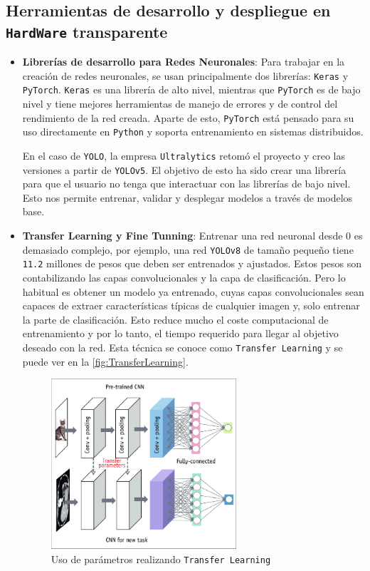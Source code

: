 \subsection{Herramientas de desarrollo y despliegue en \texttt{HardWare} transparente}

\begin{itemize}
    \item \textbf{Librerías de desarrollo para Redes Neuronales}: Para trabajar en la creación de redes neuronales, se usan principalmente dos librerías: \texttt{Keras} y \texttt{PyTorch}.
    \texttt{Keras} es una librería de alto nivel, mientras que \texttt{PyTorch} es de bajo nivel y tiene mejores herramientas de manejo de errores y de control del rendimiento de la red creada. 
    Aparte de esto, \texttt{PyTorch} está pensado para su uso directamente en \texttt{Python} y soporta entrenamiento en sistemas distribuidos.


    En el caso de \texttt{YOLO}, la empresa \texttt{Ultralytics} retomó el proyecto y creo las versiones a partir de \texttt{YOLOv5}. El objetivo de esto ha sido crear una librería para 
    que el usuario no tenga que interactuar con las librerías de bajo nivel. Esto nos permite entrenar, validar y desplegar modelos a través de modelos base.
    \item \textbf{Transfer Learning y Fine Tunning}: Entrenar una red neuronal desde 0 es demasiado complejo, por ejemplo, una red \texttt{YOLOv8} de tamaño pequeño tiene \texttt{11.2} millones de pesos que 
    deben ser entrenados y ajustados. Estos pesos son contabilizando las capas convolucionales y la capa de clasificación.\newline
    Pero lo habitual es obtener un modelo ya entrenado, cuyas capas convolucionales sean capaces de extraer características típicas de cualquier imagen y, solo entrenar la parte de clasificación. 
    Esto reduce mucho el coste computacional de entrenamiento y por lo tanto, el tiempo requerido para llegar al objetivo deseado con la red. Esta técnica se conoce como \texttt{Transfer Learning} 
    y se puede ver en la \autoref{fig:TransferLearning}.
    
    \begin{figure}[H]
        \centering
        \includegraphics[width=0.65\textwidth]{images/4/TransferLearning.png}
        \caption{Uso de parámetros realizando \texttt{Transfer Learning}\cite{doBasicsDeepLearning2020}}
        \label{fig:TransferLearning}
    \end{figure}


\end{itemize}
